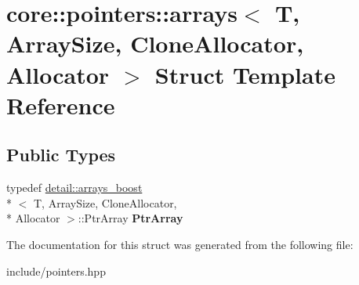 \hypertarget{structcore_1_1pointers_1_1arrays}{\section{core\-:\-:pointers\-:\-:arrays$<$ T, Array\-Size, Clone\-Allocator, Allocator $>$ Struct Template Reference}
\label{structcore_1_1pointers_1_1arrays}
}
\subsection*{Public Types}
\begin{DoxyCompactItemize}
\item 
\hypertarget{structcore_1_1pointers_1_1arrays_ada786ce3ac0178bde9ec27198e5c1298}{typedef \hyperlink{structcore_1_1pointers_1_1detail_1_1arrays__boost}{detail\-::arrays\-\_\-boost}\\*
$<$ T, Array\-Size, Clone\-Allocator, \\*
Allocator $>$\-::Ptr\-Array {\bfseries Ptr\-Array}}\label{structcore_1_1pointers_1_1arrays_ada786ce3ac0178bde9ec27198e5c1298}

\end{DoxyCompactItemize}


The documentation for this struct was generated from the following file\-:\begin{DoxyCompactItemize}
\item 
include/pointers.\-hpp\end{DoxyCompactItemize}
